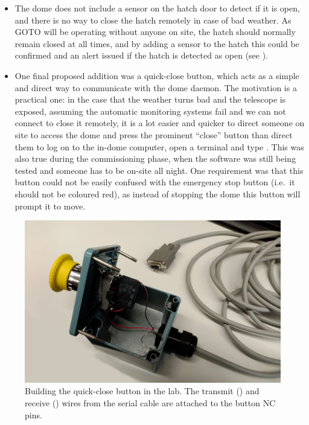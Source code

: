 \begin{colsection}
\begin{itemize}
    \item The dome does not include a sensor on the hatch door to detect if it is open, and there is no way to close the hatch remotely in case of bad weather. As GOTO will be operating without anyone on site, the hatch should normally remain closed at all times, and by adding a sensor to the hatch this could be confirmed and an alert issued if the hatch is detected as open (see ).
    \item One final proposed addition was a quick-close button, which acts as a simple and direct way to communicate with the dome daemon. The motivation is a practical one: in the case that the weather turns bad and the telescope is exposed, assuming the automatic monitoring systems fail and we can not connect to close it remotely, it is a lot easier and quicker to direct someone on site to access the dome and press the prominent ``close'' button than direct them to log on to the in-dome computer, open a terminal and type . This was also true during the commissioning phase, when the software was still being tested and someone has to be on-site all night. One requirement was that this button could not be easily confused with the emergency stop button (i.e.\ it should not be coloured red), as instead of stopping the dome this button will prompt it to move.
\end{itemize}

\begin{figure}[t]
    \begin{center}
        \includegraphics[width=0.9\linewidth]{images/button_photo.jpg}
    \end{center}
    \caption[Building the quick-close button]{
        Building the quick-close button in the lab. The transmit () and receive () wires from the serial cable are attached to the button NC pins.
    }\label{fig:quickclose_button}
\end{figure}


\end{colsection}
